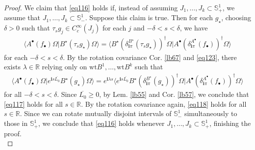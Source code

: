 \documentclass[12pt,b5paper,notitlepage]{article}
\theoremstyle{definition}
\theoremstyle{plain}
\newcommand{\ovl}{\overline}
\newcommand{\bk}[1]{\langle {#1}\rangle}
\newcommand{\im}{\mathbf{i}}
\newcommand{\blt}{\bullet}
\newcommand{\Rbb}{\mathbb R}
\newcommand{\wt}{\mathrm{wt}}
\newcommand{\Sbb}{{\mathbb S}}
\numberwithin{equation}{section}
\begin{document}
\begin{proof}
We claim that \eqref{eq116} holds if, instead of assuming $J_1,\dots,J_k\subset\Sbb^1_+$, we assume that $J_1,\dots,J_k\subset\Sbb^1_-$. Suppose this claim is true. Then for each $g_\star$, choosing $\delta>0$ such that $\tau_sg_j\in C_c^\infty(J_j)$ for each $j$ and $-\delta<s<\delta$, we have
\begin{align*}
\bk{A^\blt(f_\blt)\Omega|B^\star(\tau_sg_\star)\Omega}=\bk{B^\star(\delta^{B^\star}_{\im\pi}(\tau_sg_\star))^\dagger\Omega|A^\blt(\delta_{\im\pi}^{A^\blt}(f_\blt))^\dagger\Omega} \tag{$\triangle$} \label{eq118}
\end{align*}
for each $-\delta<s<\delta$. By the rotation covariance Cor. \ref{lb67} and \eqref{eq123}, there exists $\lambda\in\Rbb$ relying only on $\wt B^1,\dots,\wt B^k$ such that
\begin{align*}
\bk{A^\blt(f_\blt)\Omega|e^{\im s\ovl{L_0}}B^\star(g_\star)\Omega}=e^{\im \lambda s }\bk{e^{\im s\ovl{L_0}}B^\star(\delta^{B^\star}_{\im\pi}(g_\star))^\dagger\Omega|A^\blt(\delta_{\im\pi}^{A^\blt}(f_\blt))^\dagger\Omega}\tag{$\star$}\label{eq117}
\end{align*}
for all $-\delta<s<\delta$. Since $\ovl{L_0}\geq0$, by Lem. \ref{lb55} and Cor. \ref{lb57}, we conclude that \eqref{eq117} holds for all $s\in\Rbb$. By the rotation covariance again, \eqref{eq118} holds for all $s\in\Rbb$. Since we can rotate mutually disjoint intervals of $\Sbb^1_-$ simultaneously to those in $\Sbb^1_+$, we conclude that \eqref{eq116} holds whenever $J_1,\dots,J_k\subset\Sbb^1_+$, finishing the proof.\\[-1ex]



\end{proof}
\end{document}
